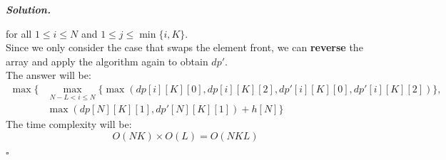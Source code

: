 \documentclass[12pt, a4paper, UTF8]{article}
\newenvironment{solution}[1][\it{Solution}]{\textbf{#1. }\\}{\begin{flushright}$\square$\end{flushright}}
\begin{document}
\begin{solution}
\begin{itemize}
                \end{itemize}
                for all $1 \le i \le N$ and $1 \le j \le \min\{i, K\}$.\\
                Since we only consider the case that swaps the element front, we can \textbf{reverse} the array and apply the algorithm again to obtain $dp'$.\\
                The answer will be:
                $$\begin{aligned}
                \max\{&\max_{N - L < i \le N}\{\max(dp[i][K][0], dp[i][K][2], dp'[i][K][0], dp'[i][K][2])\},\\ &\max(dp[N][K][1], dp'[N][K][1]) + h[N]\}\end{aligned}$$
                The time complexity will be:
                $$O(NK) \times O(L) = O(NKL)$$
            \end{solution}
\end{document}
